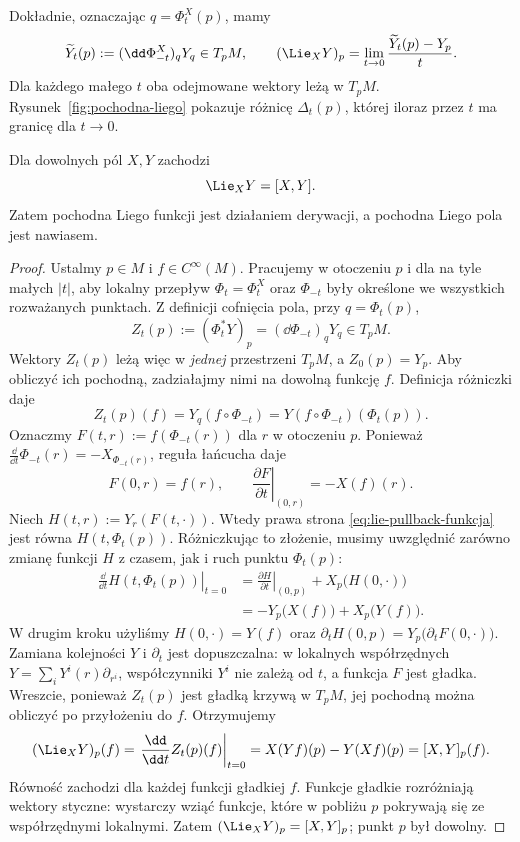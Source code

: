 Dokładnie, oznaczając $q=\Phi_t^X(p)$, mamy
\[
 \widetilde Y_t(p):=(\dd\Phi_{-t}^X)_qY_q\in T_pM,\qquad
 (\Lie_XY)_p=\lim_{t\to0}\frac{\widetilde Y_t(p)-Y_p}{t}.
\]
Dla każdego małego $t$ oba odejmowane wektory leżą w $T_pM$.
Rysunek~\ref{fig:pochodna-liego} pokazuje różnicę $\Delta_t(p)$,
której iloraz przez $t$ ma granicę dla $t\to0$.


\begin{twierdzenie}\label{thm:lie-nawias}
Dla dowolnych pól $X,Y$ zachodzi
\begin{equation}\label{eq:lie-nawias}
 \Lie_XY=[X,Y].
\end{equation}
Zatem pochodna Liego funkcji jest działaniem derywacji,
a pochodna Liego pola jest nawiasem.
\end{twierdzenie}
\begin{proof}
Ustalmy $p\in M$ i $f\in C^\infty(M)$. Pracujemy w otoczeniu $p$
i dla na tyle małych $|t|$, aby lokalny przepływ $\Phi_t=\Phi_t^X$
oraz $\Phi_{-t}$ były określone we wszystkich rozważanych punktach.
Z definicji cofnięcia pola, przy $q=\Phi_t(p)$,
\[
 Z_t(p):=(\Phi_t^*Y)_p=(\dd\Phi_{-t})_qY_q\in T_pM.
\]
Wektory $Z_t(p)$ leżą więc w \emph{jednej} przestrzeni $T_pM$,
a $Z_0(p)=Y_p$. Aby obliczyć ich pochodną, zadziałajmy nimi
na dowolną funkcję $f$. Definicja różniczki daje
\begin{equation}\label{eq:lie-pullback-funkcja}
 Z_t(p)(f)
 =Y_q(f\circ\Phi_{-t})
 =Y(f\circ\Phi_{-t})(\Phi_t(p)).
\end{equation}
Oznaczmy $F(t,r):=f(\Phi_{-t}(r))$ dla $r$ w otoczeniu $p$.
Ponieważ $\frac{\dd}{\dd t}\Phi_{-t}(r)=-X_{\Phi_{-t}(r)}$,
reguła łańcucha daje
\[
 F(0,r)=f(r),\qquad
 \left.\frac{\partial F}{\partial t}\right|_{(0,r)}
 =-X(f)(r).
\]
Niech $H(t,r):=Y_r(F(t,\cdot))$. Wtedy prawa strona
\eqref{eq:lie-pullback-funkcja} jest równa $H(t,\Phi_t(p))$.
Różniczkując to złożenie, musimy uwzględnić zarówno zmianę
funkcji $H$ z czasem, jak i ruch punktu $\Phi_t(p)$:
\begin{align*}
 \left.\frac{\dd}{\dd t}H(t,\Phi_t(p))\right|_{t=0}
 &=\left.\frac{\partial H}{\partial t}\right|_{(0,p)}
   +X_p\bigl(H(0,\cdot)\bigr) \\
 &=-Y_p\bigl(X(f)\bigr)+X_p\bigl(Y(f)\bigr).
\end{align*}
W drugim kroku użyliśmy $H(0,\cdot)=Y(f)$ oraz
$\partial_tH(0,p)=Y_p\bigl(\partial_tF(0,\cdot)\bigr)$.
Zamiana kolejności $Y$ i $\partial_t$ jest dopuszczalna:
w lokalnych współrzędnych $Y=\sum_iY^i(r)\partial_{r^i}$,
współczynniki $Y^i$ nie zależą od $t$, a funkcja $F$ jest gładka.
Wreszcie, ponieważ $Z_t(p)$ jest gładką krzywą w $T_pM$,
jej pochodną można obliczyć po przyłożeniu do $f$. Otrzymujemy
\[
 (\Lie_XY)_p(f)
 =\left.\frac{\dd}{\dd t}Z_t(p)(f)\right|_{t=0}
 =X(Yf)(p)-Y(Xf)(p)=[X,Y]_p(f).
\]
Równość zachodzi dla każdej funkcji gładkiej $f$. Funkcje gładkie
rozróżniają wektory styczne: wystarczy wziąć funkcje, które
w pobliżu $p$ pokrywają się ze współrzędnymi lokalnymi.
Zatem $(\Lie_XY)_p=[X,Y]_p$; punkt $p$ był dowolny.
\end{proof}


